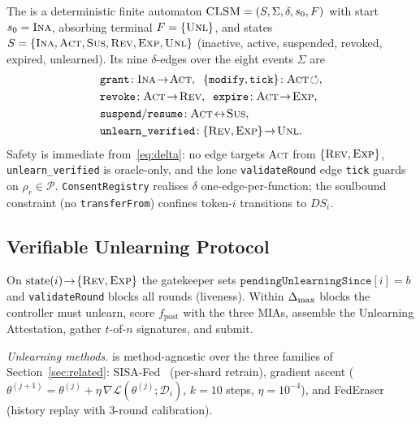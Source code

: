 The \clsm is a deterministic finite automaton
$\textsc{CLSM}=(S,\Sigma,\delta,s_0,F)$ with start $s_0=\textsc{Ina}$, absorbing
terminal $F=\{\textsc{Unl}\}$, and states
$S=\{\textsc{Ina},\textsc{Act},\textsc{Sus},\textsc{Rev},\textsc{Exp},
\textsc{Unl}\}$ (inactive, active, suspended, revoked, expired,
unlearned). Its nine $\delta$-edges over the eight events $\Sigma$ are
\begin{equation}\label{eq:delta}
\begin{aligned}
&\texttt{grant}\!:\textsc{Ina}\!\to\!\textsc{Act},\;\;
\{\texttt{modify},\texttt{tick}\}\!:\textsc{Act}\!\circlearrowleft,\\
&\texttt{revoke}\!:\textsc{Act}\!\to\!\textsc{Rev},\;\;
\texttt{expire}\!:\textsc{Act}\!\to\!\textsc{Exp},\\
&\texttt{suspend}/\texttt{resume}\!:\textsc{Act}\!\leftrightarrow\!\textsc{Sus},\\
&\texttt{unlearn\_verified}\!:\{\textsc{Rev},\textsc{Exp}\}\!\to\!\textsc{Unl}.
\end{aligned}
\end{equation}
Safety is immediate from~\eqref{eq:delta}: no edge targets \textsc{Act} from
$\{\textsc{Rev},\textsc{Exp}\}$, \texttt{unlearn\_verified} is
oracle-only, and the lone \texttt{validateRound} edge \texttt{tick}
guards on $\rho_r\in\mathcal{P}$. \texttt{ConsentRegistry}
realises $\delta$ one-edge-per-function; the soulbound constraint (no
\texttt{transferFrom}) confines token-$i$ transitions to $\mathit{DS}_i$.

\subsection{Verifiable Unlearning Protocol}
\label{sec:framework-vup}

On $\mathrm{state}(i)\!\to\!\{\textsc{Rev},\textsc{Exp}\}$ the gatekeeper
sets $\mathtt{pendingUnlearningSince}[i]=b$ and \texttt{validateRound}
blocks all rounds (liveness). Within $\Delta_{\max}$ blocks the controller must
unlearn, score $f_{\mathrm{post}}$ with the three MIAs, assemble the
Unlearning Attestation, gather $t$-of-$n$ signatures, and submit.

\emph{Unlearning methods.} \sysname is method-agnostic over the three
families of Section~\ref{sec:related}:
SISA-Fed~\cite{bourtoule2021sisa} (per-shard retrain), gradient ascent
($\theta^{(j+1)}=\theta^{(j)}+\eta\,\nabla\mathcal{L}(\theta^{(j)};
\mathcal{D}_i)$, $k=10$ steps, $\eta=10^{-4}$), and
FedEraser~\cite{liu2021federaser} (history replay with 3-round
calibration).

